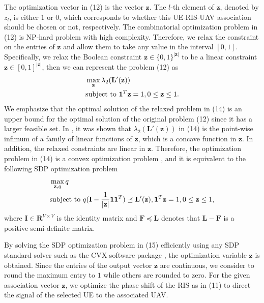 \documentclass[conference]{IEEEtran}
\begin{document}
The optimization vector in (12) is the vector $\mathbf z$. The $l$-th element of $\mathbf z$, denoted by $z_l$, is either
$1$ or $0$, which corresponds to whether this UE-RIS-UAV association should be chosen or not, respectively. The combinatorial optimization problem in (12) is NP-hard problem with high complexity. Therefore, we relax the constraint on the entries of $\mathbf z$ and allow them to take any value in the interval $[0, 1]$. Specifically, we relax the Boolean constraint $\mathbf z \in \{0,1\}^{|\mathbf z|}$ to be a linear constraint $\mathbf z \in [0,1]^{|\mathbf z|}$, then we can represent the problem (12) as
\begin{align}
&\max_{\mathbf z} \lambda_2(\mathbf L'(\mathbf z))
\label{eq10a} \\
& {\rm subject~to\ } \mathbf 1^T \mathbf z=1, 0 \leq \mathbf z \leq 1.\nonumber
\end{align}
We emphasize that the optimal solution of the relaxed problem in (14) is an upper bound for the optimal solution of the original problem (12) since it has a larger feasible set.  In \cite{4786516}, it was shown that $\lambda_2(\mathbf L'(\mathbf z))$ in (14) is the point-wise
infimum of a family of linear functions of $\mathbf z$, which is a concave function in $\mathbf z$. In addition, the relaxed constraints are linear in $\mathbf z$. Therefore, the optimization problem in (14) is a convex optimization problem \cite{4786516}, and it is equivalent to the following SDP optimization problem \cite{CON}
\begin{align}
&\max_{\mathbf z, q} q
\label{eq10a} \\
& {\rm subject~to\ } q(\mathbf I - \frac{1}{|\mathbf z|}\mathbf 1 \mathbf 1^T) \preceq \mathbf L'(\mathbf z), \mathbf 1^T \mathbf z=1, 0 \leq \mathbf z \leq 1, \nonumber
\end{align}
where $\mathbf I \in \mathbf R^{V \times V}$ is the identity matrix and $\mathbf F \preceq \mathbf L$ denotes that $\mathbf L- \mathbf F$ is a positive semi-definite matrix.

By solving the SDP optimization problem in (15) efficiently using any SDP standard solver such as the CVX software package \cite{SDP-M}, the optimization variable $\mathbf z$ is obtained.  Since the entries of the output vector $\mathbf z$ are continuous, we consider to round the maximum entry to $1$ while others are rounded to zero. For the given association vector $\mathbf z$, we optimize the phase shift of the RIS as in (11) to direct the signal of the selected UE to the associated UAV. 
  
\end{document}
